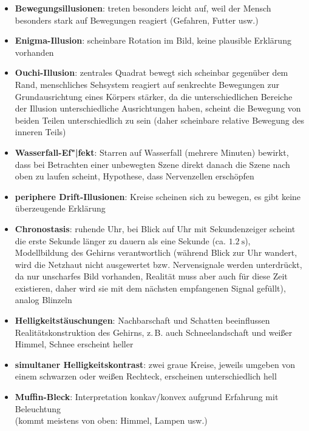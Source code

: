 \linie
\begin{itemize}
    \item
    \textbf{Bewegungsillusionen}:
    treten besonders leicht auf, weil der Mensch besonders stark auf
    Bewegungen reagiert (Gefahren, Futter usw.)

    \item
    \textbf{Enigma-Illusion}:
    scheinbare Rotation im Bild,
    keine plausible Erklärung vorhanden

    \item
    \textbf{Ouchi-Illusion}:
    zentrales Quadrat bewegt sich scheinbar gegenüber dem Rand,
    menschliches Sehsystem reagiert auf senkrechte Bewegungen zur
    Grundausrichtung eines Körpers stärker, da die unterschiedlichen
    Bereiche der Illusion unterschiedliche Ausrichtungen haben,
    scheint die Bewegung von beiden Teilen unterschiedlich zu sein
    (daher scheinbare relative Bewegung des inneren Teils)

    \item
    \textbf{Wasserfall-Ef"|fekt}:
    Starren auf Wasserfall (mehrere Minuten) bewirkt, dass bei Betrachten
    einer unbewegten Szene direkt danach die Szene nach oben zu laufen scheint,
    Hypothese, dass Nervenzellen erschöpfen

    \item
    \textbf{periphere Drift-Illusionen}:
    Kreise scheinen sich zu bewegen, es gibt keine überzeugende Erklärung

    \item
    \textbf{Chronostasis}:
    ruhende Uhr, bei Blick auf Uhr mit Sekundenzeiger scheint die erste
    Sekunde länger zu dauern als eine Sekunde (ca. $\SI{1.2}{\second}$),
    Modellbildung des Gehirns verantwortlich
    (während Blick zur Uhr wandert, wird die Netzhaut nicht ausgewertet bzw.
    Nervensignale werden unterdrückt, da nur unscharfes Bild vorhanden,
    Realität muss aber auch für diese Zeit existieren, daher wird sie
    mit dem nächsten empfangenen Signal gefüllt),
    analog Blinzeln
\end{itemize}
\linie
\pagebreak
\begin{itemize}
    \item
    \textbf{Helligkeitstäuschungen}:
    Nachbarschaft und Schatten beeinflussen Realitätskonstruktion des Gehirns,
    z.\,B. auch Schneelandschaft und weißer Himmel,
    Schnee erscheint heller

    \item
    \textbf{simultaner Helligkeitskontrast}:
    zwei graue Kreise, jeweils umgeben von einem schwarzen oder weißen
    Rechteck, erscheinen unterschiedlich hell

    \item
    \textbf{Muffin-Bleck}:
    Interpretation konkav/konvex aufgrund Erfahrung mit Beleuchtung \\
    (kommt meistens von oben: Himmel, Lampen usw.)
\end{itemize}
